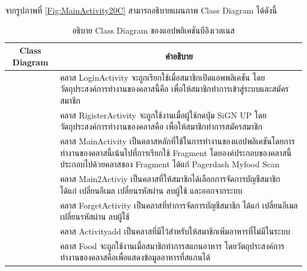 \newpage	
	จากรูปภาพที่ \ref{Fig:MainActivity20C} สามารถอธิบายแผนภาพ Class Diagram ได้ดังนี้
	\begin{table}[H]
		\centering
		\caption{อธิบาย Class Diagram ของแอปพลิเคชันบีอิงเวลเนส}
		\label{tab:class}
		\begin{tabular}{|c|p{10cm}|}
			\hline
			\textbf{Class Diagram} & \multicolumn{1}{c|}{\textbf{คำอธิบาย}} \\ \hline
			\raisebox{-\totalheight}{LoginActivity}
			& \setstretch{1.5} {คลาส LoginActivity จะถูกเรียกใช้เมื่อสมาชิกเปิดแอพพลิเคชัน โดยวัตถุประสงค์การทำงานของคลาสนี้คือ เพื่อให้สมาชิกทำการเข้าสู่ระบบและสมัครสมาชิก } \\ \hline
			\raisebox{-\totalheight}{RigisterActivity}
			& \setstretch{1.5} {คลาส RigisterActivity จะถูกใช้งานเมื่อผู้ใช้กดปุ่ม SiGN UP โดยวัตถุประสงค์การทำงานของคลาสคือ เพื่อให้สมาชิกทำการสมัครสมาชิก} \\ \hline
			\raisebox{-\totalheight}{MainActivity}
			& \setstretch{1.5} {คลาส MainActivity เป็นคลาสหลักที่ใช้ในการทำงานของแอปพลิเคชันโดยการทำงานของคลาสนี้เน้นไปที่การเรียกใช้ Fragment โดยองค์ประกอบของคลาสนี้ประกอบไปด้วยคลาสของ Fragment ได้แก่ Pagerdash Myfood Scan} \\ \hline
			\raisebox{-\totalheight}{Main2Activiy}
			& \setstretch{1.5} {คลาส Main2Activiy เป็นคลาสที่ให้สมาชิกได้เลือกการจัดการบัญชีสมาชิก ได้แก่ เปลี่ยนอีเมล เปลี่ยนรหัสผ่าน ลบผู้ใช้ และออกจากระบบ} \\ \hline
			\raisebox{-\totalheight}{ForgetActivity}
			& \setstretch{1.5} {คลาส ForgetActivity  เป็นคลาสที่ทำการจัดการบัญชีสมาชิก ได้แก่ เปลี่ยนอีเมล เปลี่ยนรหัสผ่าน ลบผู้ใช้  } \\ \hline
			\raisebox{-\totalheight}{Activityadd}
			& \setstretch{1.5} {คลาส Activityadd  เป็นคลาสที่มีไว้สำหรับให้สมาชิกเพิ่มอาหารที่ไม่มีในระบบ } \\ \hline
			\raisebox{-\totalheight}{Food}
			& \setstretch{1.5} {คลาส Food  จะถูกใช้งานเมื่อสมาชิกทำการสแกนอาหาร โดยวัตถุประสงค์การทำงานของคลาสคือเพื่อแสดงข้อมูลอาหารที่สแกนได้ } \\ \hline

	\end{tabular}
\end{table}

